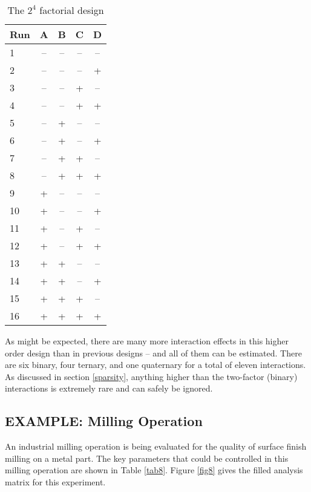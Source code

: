 \begin{table}[h]\caption{The $2^{4}$ factorial design}\label{tab7}
\begin{center}
\begin{tabular}{|l|c|c|c|c|}
\hline Run & A & B  & C  & D \\ 
\hline 1  & -- & -- & -- & --\\ 
\hline 2  & -- & -- & -- & + \\ 
\hline 3  & -- & -- & +  & --\\ 
\hline 4  & -- & -- & +  & + \\
\hline 5  & -- & +  & -- & --\\
\hline 6  & -- & +  & -- & + \\
\hline 7  & -- & +  & +  & --\\
\hline 8  & -- & +  & +  & + \\
\hline 9  & +  & -- & -- & --\\
\hline 10 & +  & -- & -- & + \\
\hline 11 & +  & -- & +  & --\\
\hline 12 & +  & -- & +  & + \\
\hline 13 & +  & +  & -- & --\\
\hline 14 & +  & +  & -- & + \\
\hline 15 & +  & +  & +  & --\\
\hline 16 & +  & +  & +  & + \\ 
\hline 
\end{tabular} 
\end{center}
\end{table}

As might be expected, there are many more interaction effects in this higher order design than in previous designs -- and all of them can be estimated. There are six binary, four ternary, and one quaternary for a total of eleven interactions.  As discussed in section \ref{sparsity}, anything higher than the two-factor (binary) interactions is extremely rare and can safely be ignored.

\subsection{EXAMPLE: Milling Operation}
An industrial milling operation is being evaluated for the quality of surface finish milling on a metal part.  The key parameters that could be controlled in this milling operation are shown in Table \ref{tab8}. Figure \ref{fig8} gives the filled analysis matrix for this experiment.

